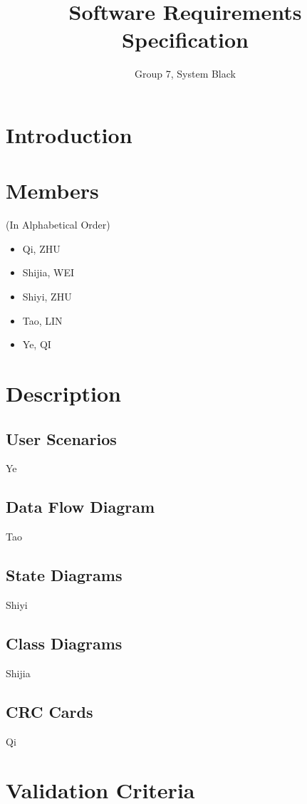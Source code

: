 \documentclass[a4]{article}
\author{Group 7, System Black}
\title{Software Requirements Specification}
\begin{document}
\maketitle


\section{Introduction}


\section{Members}
(In Alphabetical Order)
\begin{itemize}
\item Qi, ZHU

\item Shijia, WEI

\item Shiyi, ZHU

\item Tao, LIN

\item Ye, QI
\end{itemize}


\section{Description}

\subsection{User Scenarios}
Ye
\subsection{Data Flow Diagram}
Tao
\subsection{State Diagrams}
Shiyi
\subsection{Class Diagrams}
Shijia
\subsection{CRC Cards}
Qi

\section{Validation Criteria}
\end{document}
